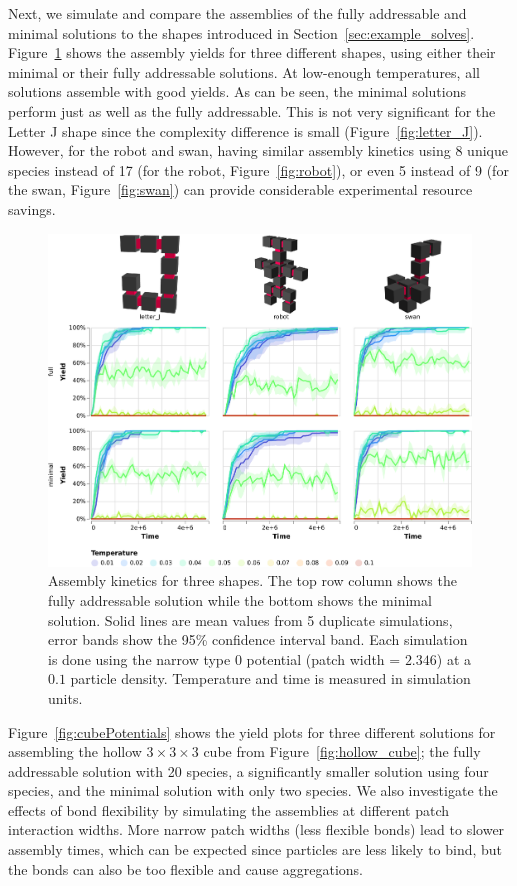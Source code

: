 Next, we simulate and compare the assemblies of the fully addressable and minimal solutions to the shapes introduced in Section~\ref{sec:example_solves}. Figure~\ref{fig:shapeKinetics} shows the assembly yields for three different shapes, using either their minimal or their fully addressable solutions. At low-enough temperatures, all solutions assemble with good yields. As can be seen, the minimal solutions perform just as well as the fully addressable. This is not very significant for the Letter J shape  since the complexity difference is small (Figure~\ref{fig:letter_J}). However, for the robot and swan, having similar assembly kinetics using 8 unique species instead of 17 (for the robot, Figure~\ref{fig:robot}), or even 5 instead of 9 (for the swan, Figure~\ref{fig:swan}) can provide considerable experimental resource savings.


\begin{figure}[h]
    \centering
    \includegraphics[width=\linewidth]{figures/patchysim/shapeKinetics.eps}
    \caption{Assembly kinetics for three shapes. The top row column shows the fully addressable solution while the bottom shows the minimal solution. Solid lines are mean values from 5 duplicate simulations, error bands show the 95\% confidence interval band. Each simulation is done using the narrow type \(0\) potential (patch width = \(2.346\)) at a \(0.1\) particle density. Temperature and time is measured in simulation units.}
    \label{fig:shapeKinetics}
\end{figure}

Figure~\ref{fig:cubePotentials} shows the yield plots for three different solutions for assembling the hollow \(3 \times 3 \times 3\) cube from Figure~\ref{fig:hollow_cube}; the fully addressable solution with 20 species, a significantly smaller solution using four species, and the minimal solution with only two species. We also investigate the effects of bond flexibility by simulating the assemblies at different patch interaction widths. More narrow patch widths (less flexible bonds) lead to slower assembly times, which can be expected since particles are less likely to bind, but the bonds can also be too flexible and cause aggregations.

